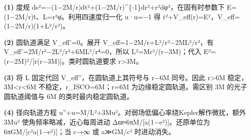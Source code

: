 \par\noindent\textbf{(1)} 度规 ds²=−(1−2M/r)dt²+(1−2M/r)\textasciicircum{}\{-1\}dr²+r²dφ²，在固有时参数下 E=(1−2M/r)ṫ、L=r²φ̇。利用四速度归一化 u·u=−1 得 ṙ²+V\_eff(r)=E²，V\_eff=(1−2M/r)(1+L²/r²)。
\par\noindent\textbf{(2)} 圆轨道满足 V\_eff'=0。展开 V\_eff=1−2M/r+L²/r²−2ML²/r³，有 V\_eff'=2M/r²−2L²/r³+6ML²/r⁴=0，所以 L²=Mr²/(r−3M)；代入 E²=(r−2M)²/[r(r−3M)]。类时圆轨道要求 r>3M。
\par\noindent\textbf{(3)} 将 L 固定代回 V\_eff''，在圆轨道上其符号与 r−6M 同号。因此 r>6M 稳定，3M<r<6M 不稳定，r\_ISCO=6M；r=6M 为边缘稳定圆轨道。需区别 3M 的光子圆轨道阈值与 6M 的类时最内稳定圆轨道。
\par\noindent\textbf{(4)} 径向轨道方程 u''+u=M/L²+3Mu²。对弱场低偏心率绕Kepler解作微扰，额外 3Mu² 使角频率略减，近心每周进动 Δϖ≈6πM/[a(1−e²)]。还原单位为 6πGM/[c²a(1−e²)]；当 c→∞ 或 a≫GM/c² 时进动消失。
